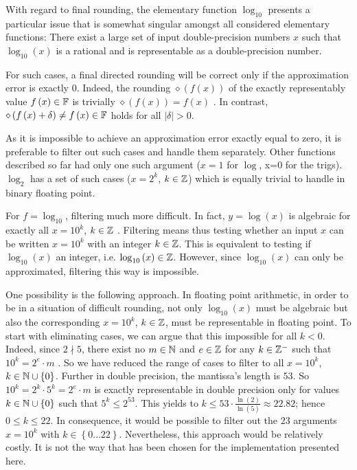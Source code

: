  With regard to final rounding, the elementary function $\log_{10}$
 presents a particular issue that is somewhat singular amongst all
 considered elementary functions: There exist a large set of input
 double-precision numbers $x$ such that $\log_{10}(x)$ is a rational
 and is representable as a double-precision number.

 For such cases, a final directed rounding will be correct only if the
 approximation error is exactly $0$. 
 Indeed, the rounding $\diamond\left( f\left( x \right) \right)$ of
 the exactly representably value $f\left(x\right) \in \mathbb {F}$ is trivially
 $\diamond\left( f\left( x \right) \right) = f\left( x \right)$
 \cite{IEEE754}. In contrast, $\diamond\left( f\left( x \right) +
   \delta \right) \not = f\left( x \right) \in \mathbb {F}$ holds for all
 $\left \vert \delta \right \vert > 0$. 

 As it is impossible to achieve an approximation error exactly equal
 to zero, it is preferable to filter out such cases and handle them
 separately. Other functions described so far had only one such argument
 ($x=1$ for $\log$, x=0 for the trigs). $\log_2$ has a set of such
 cases ($x = 2^k$, $k \in \mathbb {Z}$) which is equally trivial to handle in
 binary floating point.
 

For $f = \log_{10}$, filtering much more difficult. In fact, $y =
\log\left( x \right)$ is algebraic for exactly all $x = 10^k$, $k \in
\mathbb {Z}$ \cite{Baker75}. Filtering means thus testing whether an input $x$
can be written $x = 10^k$ with an integer $k \in \mathbb {Z}$. This is
equivalent to testing if $\log_{10}\left( x \right)$ an integer,
i.e. $\log_{10}\left( x \right) \in \mathbb {Z}$. However, since $\log_{10}\left( x
\right)$ can only be approximated, filtering this way is
impossible.

One possibility is the following approach. In
floating point arithmetic, in order to be in a situation of difficult
rounding, not only $\log_{10}\left( x \right)$ must be algebraic but
also the corresponding $x = 10^k$, $k \in \mathbb {Z}$, must be representable
in floating point. To start with eliminating cases, we can argue that
this impossible for all $k < 0$. Indeed, since $2 \nmid 5$, there
exist no $m \in \mathbb {N}$ and $e \in \mathbb {Z}$ for any $k \in \mathbb {Z}^-$ such that
$10^k = 2^e \cdot m$ \cite{Muller97}. So we have reduced the range of
cases to filter to all $x = 10^k$, $k \in \mathbb {N} \cup \left \lbrace
0\right \rbrace$. Further in double precision, the mantissa's length
is $53$. So $10^k = 2^k \cdot 5^k = 2^e \cdot m$ is exactly
representable in double precision only for values $k \in \mathbb {N} \cup \left
\lbrace 0 \right \rbrace$ such that $5^k \leq 2^{53}$. This yields to
$k \leq 53 \cdot \frac{\ln\left( 2 \right)}{\ln\left( 5 \right)}
\approx 22.82$; hence $0 \leq k \leq 22$. In consequence, it would be
possible to filter out the $23$ arguments $x = 10^k$ with $k \in \left
\lbrace 0 \dots 22 \right \rbrace$. Nevertheless, this approach would
be relatively costly. It is not the way that has been chosen for the
implementation presented here.


